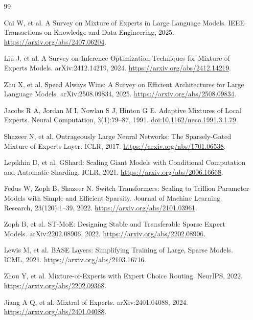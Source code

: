 \documentclass[10pt,a4paper,fontset=none]{ctexart}
\begin{document}
\clearpage
{}
\begin{thebibliography}{99}
\small
\setlength{\itemsep}{1pt}
\raggedright

Cai W, et al. A Survey on Mixture of Experts in Large Language Models. IEEE Transactions on Knowledge and Data Engineering, 2025. \url{https://arxiv.org/abs/2407.06204}.

Liu J, et al. A Survey on Inference Optimization Techniques for Mixture of Experts Models. arXiv:2412.14219, 2024. \url{https://arxiv.org/abs/2412.14219}.

Zhu X, et al. Speed Always Wins: A Survey on Efficient Architectures for Large Language Models. arXiv:2508.09834, 2025. \url{https://arxiv.org/abs/2508.09834}.

Jacobs R A, Jordan M I, Nowlan S J, Hinton G E. Adaptive Mixtures of Local Experts. Neural Computation, 3(1):79--87, 1991. \href{https://doi.org/10.1162/neco.1991.3.1.79}{doi:10.1162/neco.1991.3.1.79}.

Shazeer N, et al. Outrageously Large Neural Networks: The Sparsely-Gated Mixture-of-Experts Layer. ICLR, 2017. \url{https://arxiv.org/abs/1701.06538}.

Lepikhin D, et al. GShard: Scaling Giant Models with Conditional Computation and Automatic Sharding. ICLR, 2021. \url{https://arxiv.org/abs/2006.16668}.

Fedus W, Zoph B, Shazeer N. Switch Transformers: Scaling to Trillion Parameter Models with Simple and Efficient Sparsity. Journal of Machine Learning Research, 23(120):1--39, 2022. \url{https://arxiv.org/abs/2101.03961}.

Zoph B, et al. ST-MoE: Designing Stable and Transferable Sparse Expert Models. arXiv:2202.08906, 2022. \url{https://arxiv.org/abs/2202.08906}.

Lewis M, et al. BASE Layers: Simplifying Training of Large, Sparse Models. ICML, 2021. \url{https://arxiv.org/abs/2103.16716}.

Zhou Y, et al. Mixture-of-Experts with Expert Choice Routing. NeurIPS, 2022. \url{https://arxiv.org/abs/2202.09368}.

Jiang A Q, et al. Mixtral of Experts. arXiv:2401.04088, 2024. \url{https://arxiv.org/abs/2401.04088}.


\end{thebibliography}
\end{document}
